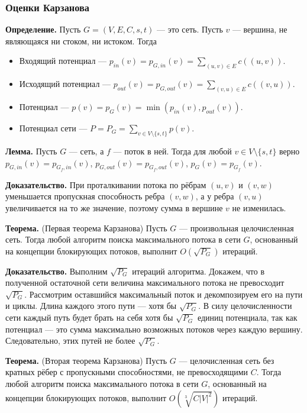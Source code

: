 \subsubsection{Оценки Карзанова}
\textbf{Определение.} Пусть $G = (V, E, C, s, t)$ --- это сеть. Пусть $v$ --- вершина, не являющаяся ни стоком, ни истоком.
Тогда 
\begin{itemize}
    \item Входящий потенциал --- $p_{in}(v) = p_{G,in}(v) = \sum_{(u, v) \in E} c((u, v))$.
    \item Исходящий потенциал --- $p_{out}(v) = p_{G,out}(v) = \sum_{(v, u) \in E} c((v, u))$.
    \item Потенциал --- $p(v) = p_G(v) = \min(p_{in}(v), p_{out}(v))$.
    \item Потенциал сети --- $P = P_G = \sum_{v \in V \setminus \{s, t\}} p(v)$.
\end{itemize}

\textbf{Лемма.} Пусть $G$ --- сеть, а $f$ --- поток в ней. Тогда для любой $v \in V \setminus \{s, t\}$ верно $p_{G, in}(v) = p_{G_f, in}(v)$, $p_{G, out}(v) = p_{G_f, out}(v)$, $p_{G}(v) = p_{G_f}(v)$.

\textbf{Доказательство.} При проталкивании потока по рёбрам $(u, v)$ и $(v, w)$ уменьшается пропускная способность ребра $(v, w)$, а у ребра $(v, u)$ увеличивается на то же значение, поэтому сумма в вершине $v$ не изменилась.

\textbf{Теорема.} (Первая теорема Карзанова) Пусть $G$ --- произвольная целочисленная сеть.
Тогда любой алгоритм поиска максимального потока в сети $G$, основанный на концепции блокирующих потоков, выполнит $O(\sqrt {P_G})$ итераций.

\textbf{Доказательство.} Выполним $\sqrt{P_G}$ итераций алгоритма. Докажем, что в полученной остаточной сети величина максимального потока не превосходит $\sqrt{P_G}$.
Рассмотрим оставшийся максимальный поток и декомпозируем его на пути и циклы.
Длина каждого этого пути --- хотя бы $\sqrt{P_G}$.
В силу целочисленности сети каждый путь будет брать на себя хотя бы $\sqrt{P_G}$ единиц потенциала, так как потенциал --- это сумма максимально возможных потоков через каждую вершину.
Следовательно, этих путей не более $\sqrt{P_G}$.

\textbf{Теорема.} (Вторая теорема Карзанова) Пусть $G$ --- целочисленная сеть без кратных рёбер с пропускными способностями, не превосходящими $C$.
Тогда любой алгоритм поиска максимального потока в сети $G$, основанный на концепции блокирующих потоков, выполнит $O(\sqrt[3]{C|V|^2})$ итераций.

